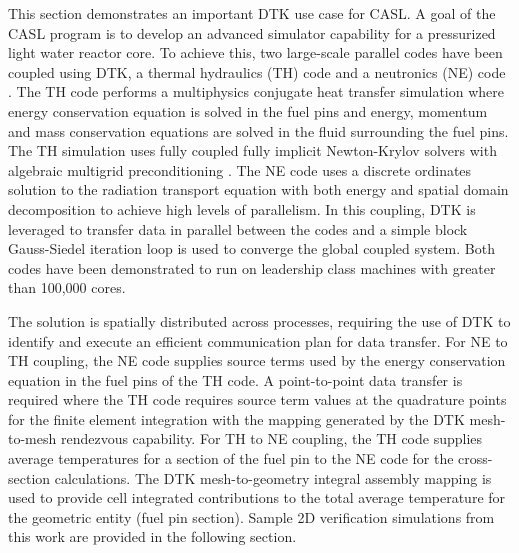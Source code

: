 \documentclass{mc2013}
\begin{document}
\label{sec:examples}

This section demonstrates an important DTK use case for CASL.  A goal
of the CASL program \cite{u.s._department_of_energy_casl_2011} is to
develop an advanced simulator capability for a pressurized light water
reactor core.  To achieve this, two large-scale parallel codes have
been coupled using DTK, a thermal hydraulics (TH) code
\cite{drekar_cfd} and a neutronics (NE) code \cite{denovo_2010}.  The
TH code performs a multiphysics conjugate heat transfer simulation
where energy conservation equation is solved in the fuel pins and
energy, momentum and mass conservation equations are solved in the
fluid surrounding the fuel pins.  The TH simulation uses fully coupled
fully implicit Newton-Krylov solvers with algebraic multigrid
preconditioning \cite{shadid_2006}.  The NE code uses a discrete
ordinates solution to the radiation transport equation with both
energy and spatial domain decomposition to achieve high levels of
parallelism.  In this coupling, DTK is leveraged to transfer data in
parallel between the codes and a simple block Gauss-Siedel iteration
loop is used to converge the global coupled system.  Both codes have
been demonstrated to run on leadership class machines with greater
than 100,000 cores.

The solution is spatially distributed across processes, requiring the
use of DTK to identify and execute an efficient communication plan for
data transfer.  For NE to TH coupling, the NE code supplies source
terms used by the energy conservation equation in the fuel pins of the
TH code.  A point-to-point data transfer is required where the TH code
requires source term values at the quadrature points for the finite
element integration with the mapping generated by the DTK mesh-to-mesh
rendezvous capability.  For TH to NE coupling, the TH code supplies
average temperatures for a section of the fuel pin to the NE code for
the cross-section calculations.  The DTK mesh-to-geometry integral
assembly mapping is used to provide cell integrated contributions to
the total average temperature for the geometric entity (fuel pin
section).  Sample 2D verification simulations from this work are
provided in the following section.

\label{subsec:cht}
\end{document}
